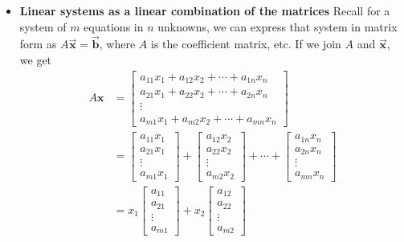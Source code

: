 \documentclass{report}
\begin{document}
\begin{itemize}
        \item \textbf{Linear systems as a linear combination of the matrices}
            \bigbreak \noindent 
            Recall for a system of $m$ equations in $n$ unknowns, we can express that system in matrix form as $A\vec{\mathbf{x}} = \vec{\mathbf{b}}$, where $A$ is the coefficient matrix, etc. If we join $A$ and $\vec{\mathbf{x}}$, we get
            \bigbreak \noindent 
            \begin{align*}
                A\mathbf{x} &=
                \begin{bmatrix} a_{11}x_1 + a_{12}x_2 + \cdots + a_{1n}x_n \\ a_{21}x_1 + a_{22}x_2 + \cdots + a_{2n}x_n \\ \vdots \\ a_{m1}x_1 + a_{m2}x_2 + \cdots + a_{mn}x_n \end{bmatrix} \\
                            &=
                            \begin{bmatrix} a_{11}x_1 \\ a_{21}x_1 \\ \vdots \\ a_{m1}x_1 \end{bmatrix}
                            +
                            \begin{bmatrix} a_{12}x_2 \\ a_{22}x_2 \\ \vdots \\ a_{m2}x_2 \end{bmatrix}
                            + \cdots +
                            \begin{bmatrix} a_{1n}x_n \\ a_{2n}x_n \\ \vdots \\ a_{mn}x_n \end{bmatrix} \\
                            &=
                            x_1
                            \begin{bmatrix} a_{11} \\ a_{21} \\ \vdots \\ a_{m1} \end{bmatrix}
                            + x_2
                            \begin{bmatrix} a_{12} \\ a_{22} \\ \vdots \\ a_{m2} \end{bmatrix}

\end{align*}
\end{itemize}
\end{document}
